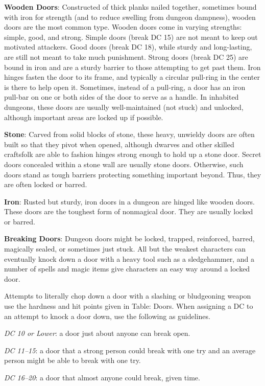 \textbf{Wooden Doors}: Constructed of thick planks nailed together, sometimes bound with iron for strength (and to reduce swelling from dungeon dampness), wooden doors are the most common type. Wooden doors come in varying strengths: simple, good, and strong. Simple doors (break DC 15) are not meant to keep out motivated attackers. Good doors (break DC 18), while sturdy and long-lasting, are still not meant to take much punishment. Strong doors (break DC 25) are bound in iron and are a sturdy barrier to those attempting to get past them. Iron hinges fasten the door to its frame, and typically a circular pull-ring in the center is there to help open it. Sometimes, instead of a pull-ring, a door has an iron pull-bar on one or both sides of the door to serve as a handle. In inhabited dungeons, these doors are usually well-maintained (not stuck) and unlocked, although important areas are locked up if possible.
				
\textbf{Stone}: Carved from solid blocks of stone, these heavy, unwieldy doors are often built so that they pivot when opened, although dwarves and other skilled craftsfolk are able to fashion hinges strong enough to hold up a stone door. Secret doors concealed within a stone wall are usually stone doors. Otherwise, such doors stand as tough barriers protecting something important beyond. Thus, they are often locked or barred.
				
\textbf{Iron}: Rusted but sturdy, iron doors in a dungeon are hinged like wooden doors. These doors are the toughest form of nonmagical door. They are usually locked or barred.
				
\textbf{Breaking Doors}: Dungeon doors might be locked, trapped, reinforced, barred, magically sealed, or sometimes just stuck. All but the weakest characters can eventually knock down a door with a heavy tool such as a sledgehammer, and a number of spells and magic items give characters an easy way around a locked door.
				
Attempts to literally chop down a door with a slashing or bludgeoning weapon use the hardness and hit points given in Table: Doors. When assigning a DC to an attempt to knock a door down, use the following as guidelines.
				
\textit{DC 10 or Lower}: a door just about anyone can break open.
				
\textit{DC 11--15}: a door that a strong person could break with one try and an average person might be able to break with one try. 
				
\textit{DC 16--20}: a door that almost anyone could break, given time.
				
